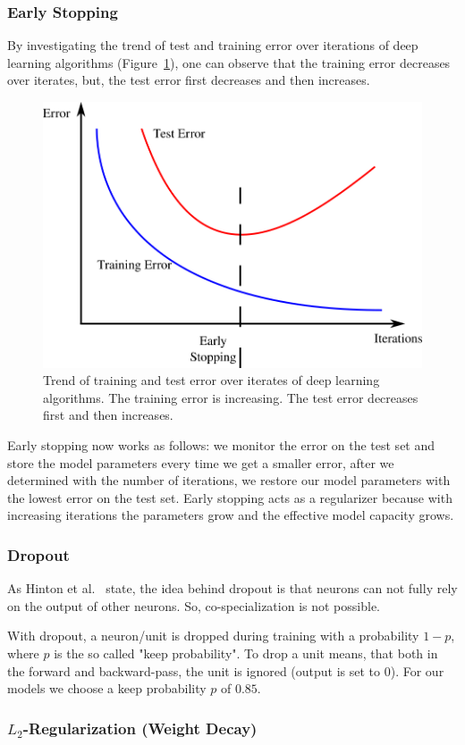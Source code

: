 \subsubsection{Early Stopping}
\label{sssec:num341}
By investigating the trend of test and training error over iterations of deep learning algorithms (Figure~\ref{fig:reg_early_stopping}), one can observe that the training error decreases over iterates, but, the test error first decreases and then increases.
\begin{figure}[H]
	\centering
	\includegraphics[width=.4\linewidth]{regularization/early_stopping.png}
	\caption[figure]{Trend of training and test error over iterates of deep learning algorithms. The training error is increasing. The test error decreases first and then increases.}
	\label{fig:reg_early_stopping}
\end{figure}
Early stopping now works as follows: we monitor the error on the test set and store the model parameters every time we get a smaller error, after we determined with the number of iterations, we restore our model parameters with the lowest error on the test set. Early stopping acts as a regularizer because with increasing iterations the parameters grow and the effective model capacity grows. 

\subsubsection{Dropout}
\label{sssec:num342}
As Hinton et al.~\cite{Hinton12} state, the idea behind dropout is that neurons can not fully rely on the output of other neurons. So, co-specialization is not possible.

With dropout, a neuron/unit is dropped during training with a probability $1-p$, where $p$ is the so called "keep probability". To drop a unit means, that both in the forward and backward-pass, the unit is ignored (output is set to $0$). For our models we choose a keep probability $p$ of $0.85$.


\subsubsection{$L_2$-Regularization (Weight Decay)}
\label{sssec:num343}

